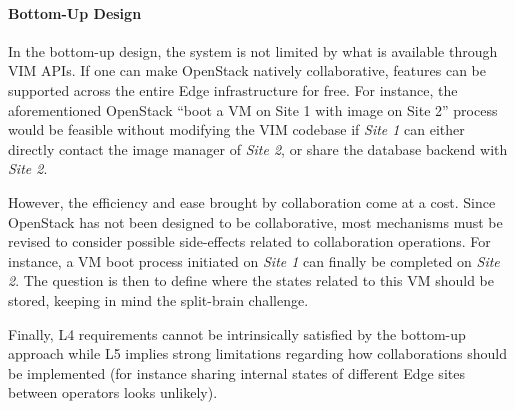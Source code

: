 

\paragraph{Bottom-Up Design}
In the bottom-up design, the system is not limited by what is
available through VIM APIs. If one can make OpenStack natively
collaborative, features can be supported across the entire
Edge infrastructure for free. For instance, the aforementioned
OpenStack ``boot a VM on Site 1 with image on Site 2'' process would
be feasible without modifying the VIM codebase if \emph{Site 1} can
either directly contact the image manager of \emph{Site 2}, or share
the database backend with \emph{Site 2}.

However, the efficiency and ease brought by collaboration come at a
cost. Since OpenStack has not been designed to be collaborative, most
mechanisms must be revised to consider possible side-effects related to
collaboration operations.
%
For instance, a VM boot process initiated on \emph{Site 1} can finally be
completed on \emph{Site 2}. The question is then to define where the states
related to this VM should be stored, keeping in mind the split-brain
challenge.

Finally, L4 requirements cannot be intrinsically satisfied by the
bottom-up approach while L5 implies strong limitations regarding how
collaborations should be implemented (for instance sharing internal
states of different Edge sites between operators looks unlikely).

%



